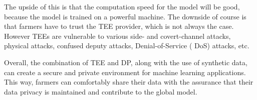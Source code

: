 The upside of this is that the computation speed for the model will be good, because the model is trained on a powerful machine. The
downside of course is that farmers have to trust the TEE provider, which is not always the case.
However TEEs are vulnerable to various side- and covert-channel attacks, physical attacks, confused deputy attacks, Denial-of-Service (
DoS) attacks, etc.~\cite[]{mo2022sok}

Overall, the combination of TEE and DP, along with the use of synthetic data, can create a secure and private environment for machine learning applications.
This way, farmers can comfortably share their data with the assurance that their data privacy is maintained and contribute to the global model.
